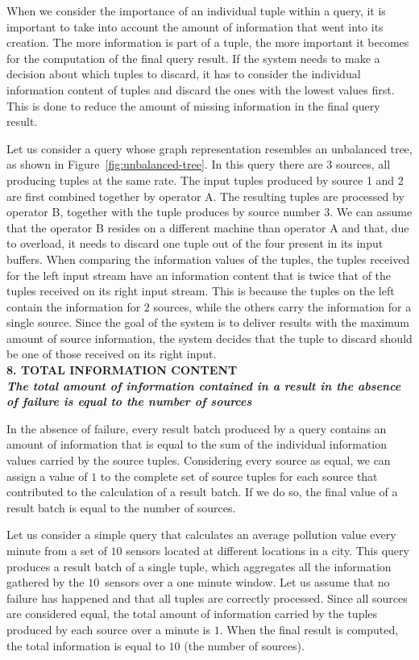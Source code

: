 	
	When we consider the importance of an individual tuple within a query, it is important to take into account the
	amount of information that went into its creation. The more information is part of a tuple, the 
	more important it becomes for the computation of the final query result. If the system needs to make a
	decision about which tuples to discard, it has to consider the individual information content of tuples and
	discard the ones with the lowest values first. This is done to reduce the amount of missing information in
	the final query result. 
	
Let us consider a query whose graph representation resembles an unbalanced tree, as shown in
\mbox{Figure~\ref{fig:unbalanced-tree}}. In this query there are $3$ sources, all producing tuples at the
same rate. The input tuples produced by source 1 and 2 are first combined together by operator A. The
resulting tuples are processed by operator B, together with the tuple produces by source number $3$.
We can assume that the operator B resides on a different machine than operator A and that, due to
overload, it needs to discard one tuple out of the four present in its input buffers. When comparing the
information values of the tuples, the tuples received for the left input stream have an information
content that is twice that of the tuples received on its right input stream. This is because the tuples
on the left contain the information for $2$ sources, while the others carry the
information for a single source. Since the goal of the system is to deliver results with the maximum
amount of source information, the system decides that the tuple to discard should be one of those
received on its right input. \\

\textbf{8. TOTAL INFORMATION CONTENT \\ \textit{The total amount of information contained in a result in
the absence of failure is equal to the number of sources}}
	
In the absence of failure, every result batch produced by a query contains an amount of information that
is equal to the sum of the individual information values carried by the source tuples.
Considering every source as equal, we can assign a value of $1$ to the complete set of source tuples for
each source that contributed to the calculation of a result batch. If we do so, the final value of a
result batch is equal to the number of sources.
	
	Let us consider a simple query that calculates an average pollution value every minute from a set of
	$10$ sensors located at different locations in a city. This query produces a result batch of a single tuple,
	which aggregates all the information gathered by the $10$~sensors over a one minute window. Let us
	assume that no failure has happened and that all tuples are correctly processed. Since all sources are
	considered equal, the total amount of information carried by the tuples produced by each source
	over a minute is $1$. When the final result is computed, the total information is equal
	to $10$ (\ie the number of sources).
	
